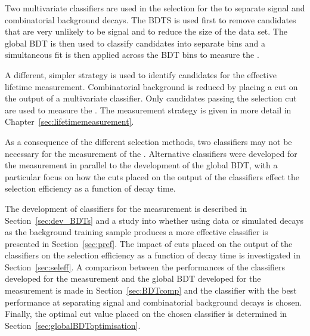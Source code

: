 Two multivariate classifiers are used in the selection for the \BFm to separate signal and combinatorial background decays. The BDTS is used first to remove candidates that are very unlikely to be signal and to reduce the size of the data set. The global BDT is then used to classify candidates into separate bins and a simultaneous fit is then applied across the BDT bins to measure the \BFs.

A different, simpler strategy is used to identify candidates for the \bsmumu effective lifetime measurement. Combinatorial background is reduced by placing a cut on the output of a multivariate classifier. Only candidates passing the selection cut are used to measure the \el. The measurement strategy is given in more detail in Chapter~\ref{sec:lifetimemeasurement}. 

As a consequence of the different selection methods, two classifiers may not be necessary for the measurement of the \el. Alternative classifiers were developed for the \el measurement in parallel to the development of the global BDT, with a particular focus on how the cuts placed on the output of the classifiers effect the selection efficiency as a function of decay time.


The development of classifiers for the \el measurement is described in Section~\ref{sec:dev_BDTs} and a study into whether using data or simulated decays as the background training sample produces a more effective classifier is presented in Section~\ref{sec:pref}. 
The impact of cuts placed on the output of the classifiers on the selection efficiency as a function of decay time is investigated in Section~\ref{sec:seleff}. A comparison between the performances of the classifiers developed for the \el measurement and the global BDT developed for the \BF measurement is made in Section~\ref{sec:BDTcomp} and the classifier with the best performance at separating signal and combinatorial background decays is chosen.
Finally, the optimal cut value placed on the chosen classifier is determined in Section~\ref{sec:globalBDToptimisation}.



